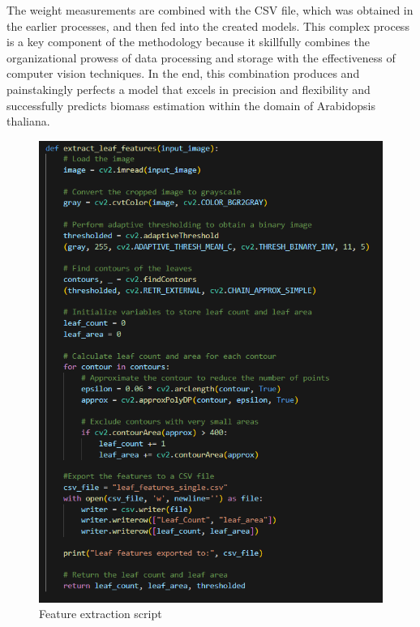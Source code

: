 \documentclass[a4paper,12pt]{report}%
\renewcommand{\\}{\vspace*{0.5\baselineskip} \newline}
\begin{document}
\noindent The weight measurements are combined with the CSV file, which was obtained in the earlier processes, and then fed into the created models. This complex process is a key component of the methodology because it skillfully combines the organizational prowess of data processing and storage with the effectiveness of computer vision techniques. In the end, this combination produces and painstakingly perfects a model that excels in precision and flexibility and successfully predicts biomass estimation within the domain of Arabidopsis thaliana. 

\begin{figure}[h]
\centering
	\includegraphics[scale=0.95]{images/extract features.png}\\
	\begin{footnotesize}
		\caption{Feature extraction script}
		\label{Feature extraction script}
	\end{footnotesize}
\end{figure}
\end{document}
